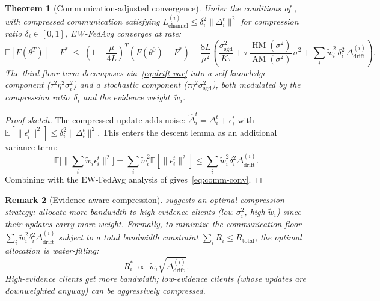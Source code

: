 \documentclass[11pt,a4paper]{article}
\newtheorem{theorem}{Theorem}[section]
\newtheorem{remark}[theorem]{Remark}
\DeclareMathOperator{\AM}{AM}
\DeclareMathOperator{\HM}{HM}
\newcommand{\E}{\mathbb{E}}
\newcommand{\norm}[1]{\|#1\|}
\begin{document}
\begin{theorem}[Communication-adjusted convergence]\label{thm:comm-conv}
Under the conditions of , with compressed
communication satisfying $L_{\text{channel}}^{(i)} \leq \delta_i^2\norm{\Delta_i^t}^2$
for compression ratio $\delta_i \in [0,1]$, EW-FedAvg converges at rate:
\begin{equation}\label{eq:comm-conv}
  \E[F(\theta^T)] - F^*
  \;\leq\; \left(1 - \frac{\mu}{4L}\right)^T (F(\theta^0) - F^*)
  + \frac{8L}{\mu^2}\left(
    \frac{\sigma_{\text{sgd}}^2}{K\tau}
    + \tau\,\frac{\HM(\sigma^2)}{\AM(\sigma^2)}\,\bar{\sigma}^2
    + \sum_i \tilde{w}_i^2\,\delta_i^2\,\Delta_{\text{drift}}^{(i)}
  \right).
\end{equation}
The third floor term decomposes via~\eqref{eq:drift-var} into a
self-knowledge component ($\tau^2\eta^2\sigma_i^2$) and a stochastic
component ($\tau\eta^2\sigma_{\text{sgd}}^2$), both modulated by the
compression ratio~$\delta_i$ and the evidence weight~$\tilde{w}_i$.
\end{theorem}

\begin{proof}[Proof sketch]
The compressed update adds noise:
$\hat{\Delta}_i^t = \Delta_i^t + \epsilon_i^t$ with
$\E[\norm{\epsilon_i^t}^2] \leq \delta_i^2\norm{\Delta_i^t}^2$.
This enters the descent lemma as an additional variance term:
\[
  \E\bigl[\norm{\textstyle\sum_i \tilde{w}_i \epsilon_i^t}^2\bigr]
  = \sum_i \tilde{w}_i^2 \E[\norm{\epsilon_i^t}^2]
  \leq \sum_i \tilde{w}_i^2 \delta_i^2 \Delta_{\text{drift}}^{(i)}.
\]
Combining with the EW-FedAvg analysis of 
gives~\eqref{eq:comm-conv}.
\end{proof}

\begin{remark}[Evidence-aware compression]
 suggests an optimal compression strategy: allocate
more bandwidth to high-evidence clients (low $\sigma_i^2$, high $\tilde{w}_i$)
since their updates carry more weight. Formally, to minimize the
communication floor $\sum_i \tilde{w}_i^2 \delta_i^2 \Delta_{\text{drift}}^{(i)}$
subject to a total bandwidth constraint $\sum_i R_i \leq R_{\text{total}}$,
the optimal allocation is water-filling:
\begin{equation}
  R_i^* \;\propto\; \tilde{w}_i \sqrt{\Delta_{\text{drift}}^{(i)}}.
\end{equation}
High-evidence clients get more bandwidth; low-evidence clients (whose
updates are downweighted anyway) can be aggressively compressed.
\end{remark}
\end{document}
